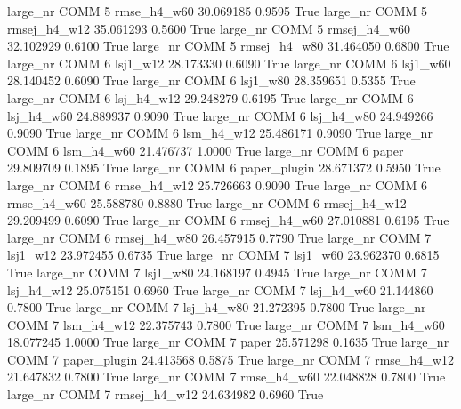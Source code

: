   large_nr     COMM                 5  rmse_h4_w60   30.069185      0.9595    True
  large_nr     COMM                 5 rmsej_h4_w12   35.061293      0.5600    True
  large_nr     COMM                 5 rmsej_h4_w60   32.102929      0.6100    True
  large_nr     COMM                 5 rmsej_h4_w80   31.464050      0.6800    True
  large_nr     COMM                 6     lsj1_w12   28.173330      0.6090    True
  large_nr     COMM                 6     lsj1_w60   28.140452      0.6090    True
  large_nr     COMM                 6     lsj1_w80   28.359651      0.5355    True
  large_nr     COMM                 6   lsj_h4_w12   29.248279      0.6195    True
  large_nr     COMM                 6   lsj_h4_w60   24.889937      0.9090    True
  large_nr     COMM                 6   lsj_h4_w80   24.949266      0.9090    True
  large_nr     COMM                 6   lsm_h4_w12   25.486171      0.9090    True
  large_nr     COMM                 6   lsm_h4_w60   21.476737      1.0000    True
  large_nr     COMM                 6        paper   29.809709      0.1895    True
  large_nr     COMM                 6 paper_plugin   28.671372      0.5950    True
  large_nr     COMM                 6  rmse_h4_w12   25.726663      0.9090    True
  large_nr     COMM                 6  rmse_h4_w60   25.588780      0.8880    True
  large_nr     COMM                 6 rmsej_h4_w12   29.209499      0.6090    True
  large_nr     COMM                 6 rmsej_h4_w60   27.010881      0.6195    True
  large_nr     COMM                 6 rmsej_h4_w80   26.457915      0.7790    True
  large_nr     COMM                 7     lsj1_w12   23.972455      0.6735    True
  large_nr     COMM                 7     lsj1_w60   23.962370      0.6815    True
  large_nr     COMM                 7     lsj1_w80   24.168197      0.4945    True
  large_nr     COMM                 7   lsj_h4_w12   25.075151      0.6960    True
  large_nr     COMM                 7   lsj_h4_w60   21.144860      0.7800    True
  large_nr     COMM                 7   lsj_h4_w80   21.272395      0.7800    True
  large_nr     COMM                 7   lsm_h4_w12   22.375743      0.7800    True
  large_nr     COMM                 7   lsm_h4_w60   18.077245      1.0000    True
  large_nr     COMM                 7        paper   25.571298      0.1635    True
  large_nr     COMM                 7 paper_plugin   24.413568      0.5875    True
  large_nr     COMM                 7  rmse_h4_w12   21.647832      0.7800    True
  large_nr     COMM                 7  rmse_h4_w60   22.048828      0.7800    True
  large_nr     COMM                 7 rmsej_h4_w12   24.634982      0.6960    True
